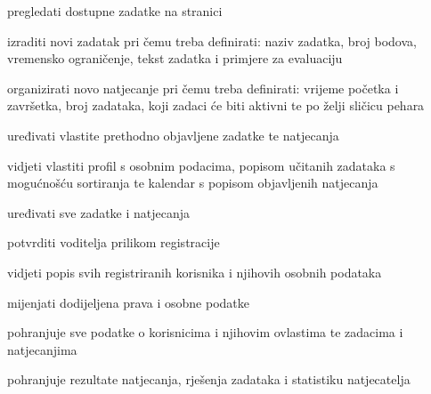 \begin{packed_enum}
\begin{packed_enum}
				\end{packed_enum}
				
				\item  {}
				
				\begin{packed_enum}
					
					\item pregledati dostupne zadatke na stranici
					\item izraditi novi zadatak pri čemu treba definirati: naziv zadatka, broj bodova, vremensko ograničenje, tekst zadatka i primjere za evaluaciju
					\item organizirati novo natjecanje pri čemu treba definirati: vrijeme početka i završetka, broj zadataka, koji zadaci će biti aktivni te po želji sličicu pehara
					\item uređivati vlastite prethodno objavljene zadatke te natjecanja
					\item vidjeti vlastiti profil s osobnim podacima, popisom učitanih zadataka s mogućnošću sortiranja te kalendar s popisom objavljenih natjecanja
										
				\end{packed_enum}
				
				\item  {}
				
				\begin{packed_enum}
					
					\item uređivati sve zadatke i natjecanja
					\item potvrditi voditelja prilikom registracije
					\item vidjeti popis svih registriranih korisnika i njihovih osobnih podataka
					\item mijenjati dodijeljena prava i osobne podatke

				\end{packed_enum}
				
				\item  {}
				
				\begin{packed_enum}
					
					\item pohranjuje sve podatke o korisnicima i njihovim ovlastima te zadacima i natjecanjima
					\item pohranjuje rezultate natjecanja, rješenja zadataka i statistiku natjecatelja			
					
				\end{packed_enum}
			\end{packed_enum}
			
